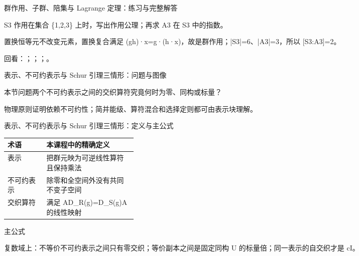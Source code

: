 \begin{frame}[t]{群作用、子群、陪集与 Lagrange 定理：练习与完整解答}
\footnotesize
\begin{block}{}S3 作用在集合 \{1,2,3\} 上时，写出作用公理；再求 A3 在 S3 中的指数。\end{block}
\begin{exampleblock}{}置换恒等元不改变元素，置换复合满足 (gh)·x=g·(h·x)，故是群作用；|S3|=6、|A3|=3，所以 [S3:A3]=2。\end{exampleblock}
\vfill
\scriptsize 回看：；；；。
\end{frame}

\begin{frame}[t]{表示、不可约表示与 Schur 引理三情形：问题与图像}
\footnotesize
\begin{block}{本节问题}两个不可约表示之间的交织算符究竟何时为零、同构或标量？\end{block}
\begin{block}{物理原则}\quad 证明依赖不可约性；简并能级、算符混合和选择定则都可由表示块理解。\end{block}
\end{frame}

\begin{frame}[t]{表示、不可约表示与 Schur 引理三情形：定义与主公式}
\footnotesize\begin{tabularx}{\linewidth}{p{0.30\linewidth}Y}
\toprule 术语 & 本课程中的精确定义\\\midrule
{} 表示 & 把群元映为可逆线性算符且保持乘法\\
 不可约表示 & 除零和全空间外没有共同不变子空间\\
 交织算符 & 满足 AD\_R(g)=D\_S(g)A 的线性映射\\
\bottomrule\end{tabularx}\vspace{0.15cm}
\begin{block}{ 主公式}\centering{}\end{block}
复数域上：不等价不可约表示之间只有零交织；等价副本之间是固定同构 U 的标量倍；同一表示的自交织才是 cI。
\end{frame}

